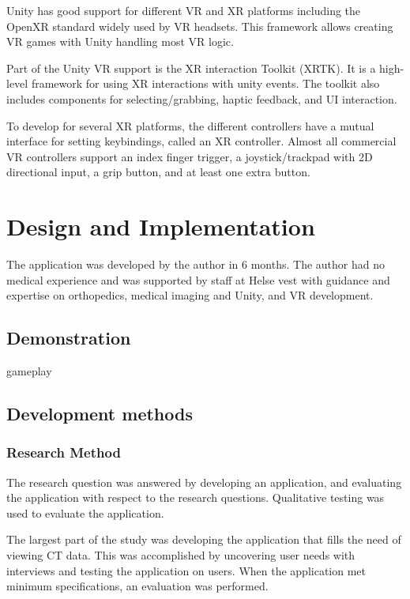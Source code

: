 \documentclass[a4paper]{report}
\begin{document}
Unity has good support for different VR and XR platforms\cite{technologies_unity_nodate-3} including the OpenXR standard widely used by VR headsets\cite{noauthor_openxr_2016}. This framework allows creating VR games with Unity handling most VR logic.

Part of the Unity VR support is the XR interaction Toolkit (XRTK)\cite{noauthor_xr_nodate}. It is a high-level framework for using XR interactions with unity events. The toolkit also includes components for selecting/grabbing, haptic feedback, and UI interaction.

To develop for several XR platforms, the different controllers have a mutual interface for setting keybindings, called an XR controller. Almost all commercial VR controllers support an index finger trigger, a joystick/trackpad with 2D directional input, a grip button, and at least one extra button\cite{technologies_unity_nodate}.


\chapter{Design and Implementation}\label{Design and Implementation}
The application was developed by the author in 6 months. The author had no medical experience and was supported by staff at Helse vest with guidance and expertise on orthopedics, medical imaging and Unity, and VR development.

\section{Demonstration}\label{demonstration}
gameplay

\section{Development methods}

\subsection{Research Method}
The research question was answered by developing an application, and evaluating the application with respect to the research questions. Qualitative testing was used to evaluate the application.

The largest part of the study was developing the application that fills the need of viewing CT data. This was accomplished by uncovering user needs with interviews and testing the application on users. When the application met minimum specifications, an evaluation was performed. 
\end{document}
